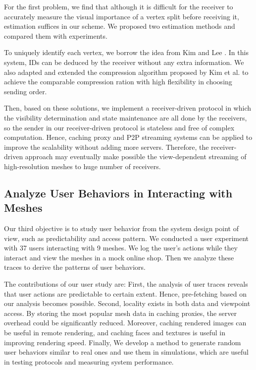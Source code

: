 \documentclass[11pt, a4paper]{report}
\begin{document}
    For the first problem, we find that although it is difficult
    for the receiver to accurately measure
    the visual importance of a vertex split before receiving it, 
    estimation suffices in our scheme. 
    We proposed two estimation methods and compared them with experiments.
    
    To uniquely identify each vertex, we borrow the idea from Kim and Lee \cite{kim01truly}.
    In this system, IDs can be deduced by the receiver without any extra information. 
    We also adapted and extended the compression algorithm proposed by Kim et al. \cite{multiresolution:kim}
    to achieve the comparable compression ration with high flexibility in choosing 
    sending order.
    
    Then, based on these solutions, we implement a receiver-driven protocol in which 
    the visibility determination and state maintenance are all done by the receivers, so 
    the sender in our receiver-driven protocol is stateless and free of complex computation.
    Hence, caching proxy and P2P streaming systems can be applied to improve
    the scalability without adding more servers.  
    Therefore, the receiver-driven approach may eventually
    make possible the view-dependent streaming of high-resolution meshes to huge number of receivers.
    
    \subsection{Analyze User Behaviors in Interacting with Meshes}
    Our third objective is to study user behavior from the system design point of view, 
    such as predictability and access pattern.
    We conducted a user experiment with 37 users interacting with 9 meshes.
    We log the user's actions while they interact and view the meshes in a mock online shop.
    Then we analyze these traces to derive the patterns of user behaviors.

    The contributions of our user study are:
    First, the analysis of user traces reveals that 
        user actions are predictable to certain extent. 
        Hence, pre-fetching based on our analysis becomes possible.
        Second, 
        locality exists in both data and viewpoint access. By
        storing the most popular mesh data in caching proxies, 
        the server overhead could be significantly reduced. 
        Moreover, caching rendered images can be useful in remote rendering,
        and caching faces and textures is useful in improving rendering speed.
        Finally,
        We develop a method to generate random user behaviors similar to real ones
        and use them in simulations, 
        which are useful in testing protocols and measuring system performance.
\end{document}
